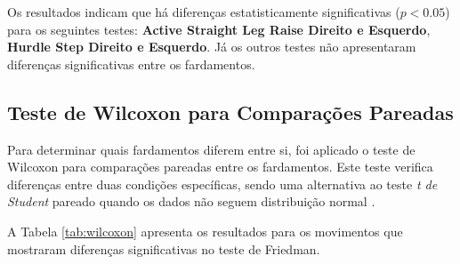 Os resultados indicam que há diferenças estatisticamente significativas ($p < 0.05$) para os seguintes testes: \textbf{Active Straight Leg Raise Direito e Esquerdo}, \textbf{Hurdle Step Direito e Esquerdo}. Já os outros testes não apresentaram diferenças significativas entre os fardamentos.

\subsection{Teste de Wilcoxon para Comparações Pareadas}
Para determinar quais fardamentos diferem entre si, foi aplicado o teste de Wilcoxon para comparações pareadas entre os fardamentos. Este teste verifica diferenças entre duas condições específicas, sendo uma alternativa ao teste \textit{t de Student} pareado quando os dados não seguem distribuição normal \cite{hilton1996appropriateness}.

A Tabela \ref{tab:wilcoxon} apresenta os resultados para os movimentos que mostraram diferenças significativas no teste de Friedman.

